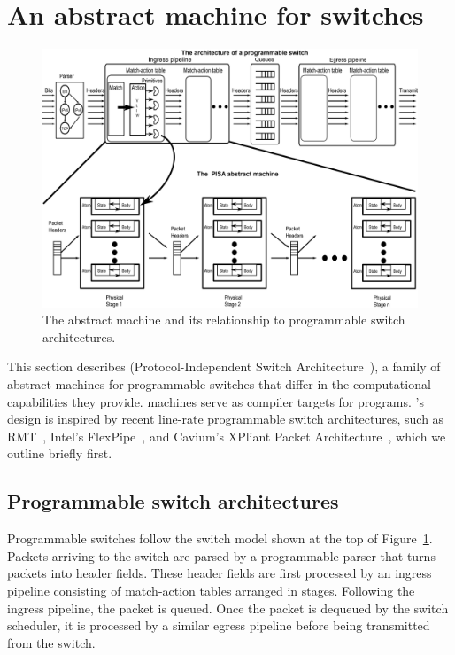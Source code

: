 \section{An abstract machine for switches}
\label{s:absmachine}

\begin{figure}[!t]
  \includegraphics[width=\textwidth]{pisa.pdf}
  \caption{The \absmachine abstract machine and its relationship to
  programmable switch architectures.}
  \label{fig:switch}
\end{figure}

This section describes \absmachine (Protocol-Independent Switch
Architecture~\cite{nick_p4}), a family of abstract machines for programmable
switches that differ in the computational capabilities they provide.
\absmachine machines serve as compiler targets for \pktlanguage programs.
\absmachine's design is inspired by recent line-rate programmable switch
architectures, such as RMT~\cite{rmt}, Intel's FlexPipe~\cite{flexpipe}, and
Cavium's XPliant Packet Architecture~\cite{xpliant}, which we outline briefly
first.

\subsection{Programmable switch architectures}
Programmable switches follow the switch model shown at the top of
Figure~\ref{fig:switch}.  Packets arriving to the switch are parsed by a
programmable parser that turns packets into header fields. These header fields
are first processed by an ingress pipeline consisting of match-action tables
arranged in stages.  Following the ingress pipeline, the packet is queued. Once
the packet is dequeued by the switch scheduler, it is processed by a similar
egress pipeline before being transmitted from the switch.

